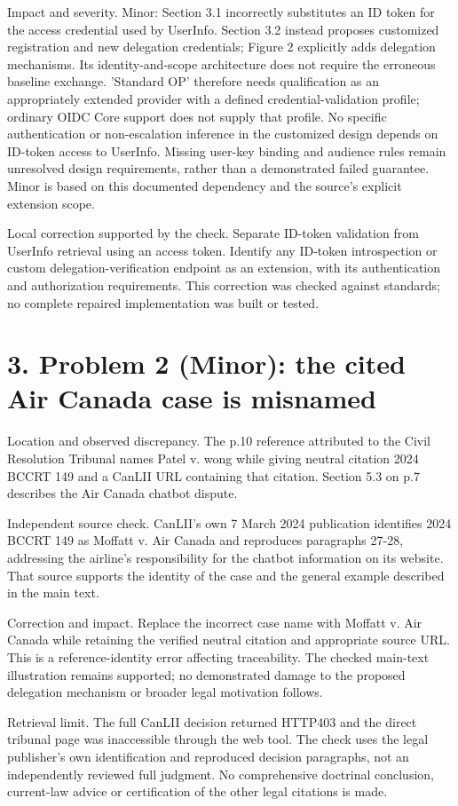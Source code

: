 \documentclass[10pt]{article}
\begin{document}
Impact and severity. Minor: Section 3.1 incorrectly substitutes an ID token for the access credential used by UserInfo. Section 3.2 instead proposes customized registration and new delegation credentials; Figure 2 explicitly adds delegation mechanisms. Its identity-and-scope architecture does not require the erroneous baseline exchange. ’Standard OP’ therefore needs qualification as an appropriately extended provider with a defined credential-validation profile; ordinary OIDC Core support does not supply that profile. No specific authentication or non-escalation inference in the customized design depends on ID-token access to UserInfo. Missing user-key binding and audience rules remain unresolved design requirements, rather than a demonstrated failed guarantee. Minor is based on this documented dependency and the source’s explicit extension scope.\par
Local correction supported by the check. Separate ID-token validation from UserInfo retrieval using an access token. Identify any ID-token introspection or custom delegation-verification endpoint as an extension, with its authentication and authorization requirements. This correction was checked against standards; no complete repaired implementation was built or tested.\par
\section*{3. Problem 2 (Minor): the cited Air Canada case is misnamed}
Location and observed discrepancy. The p.10 reference attributed to the Civil Resolution Tribunal names Patel v. wong while giving neutral citation 2024 BCCRT 149 and a CanLII URL containing that citation. Section 5.3 on p.7 describes the Air Canada chatbot dispute.\par
Independent source check. CanLII’s own 7 March 2024 publication identifies 2024 BCCRT 149 as Moffatt v. Air Canada and reproduces paragraphs 27-28, addressing the airline’s responsibility for the chatbot information on its website. That source supports the identity of the case and the general example described in the main text.\par
Correction and impact. Replace the incorrect case name with Moffatt v. Air Canada while retaining the verified neutral citation and appropriate source URL. This is a reference-identity error affecting traceability. The checked main-text illustration remains supported; no demonstrated damage to the proposed delegation mechanism or broader legal motivation follows.\par
Retrieval limit. The full CanLII decision returned HTTP403 and the direct tribunal page was inaccessible through the web tool. The check uses the legal publisher’s own identification and reproduced decision paragraphs, not an independently reviewed full judgment. No comprehensive doctrinal conclusion, current-law advice or certification of the other legal citations is made.\par
\end{document}

